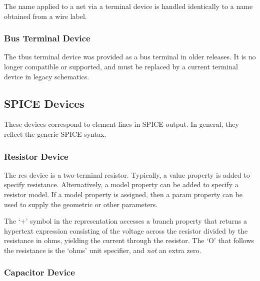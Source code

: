 The name applied to a net via a terminal device is handled
identically to a name obtained from a wire label.

\subsubsection{Bus Terminal Device}
The {\et tbus} terminal device was provided as a bus terminal in older
{\Xic} releases.  It is no longer compatible or supported, and must be
replaced by a current terminal device in legacy schematics.

\subsection{SPICE Devices}

These devices correspond to element lines in SPICE output.  In general,
they reflect the generic SPICE syntax.

\subsubsection{Resistor Device}

The {\et res} device is a two-terminal resistor.  Typically, a {\et
value} property is added to specify resistance.  Alternatively, a {\et
model} property can be added to specify a resistor model.  If a {\et
model} property is assigned, then a {\et param} property can be used
to supply the geometric or other parameters.

The `$+$' symbol in the representation accesses a {\et branch}
property that returns a hypertext expression consisting of the voltage
across the resistor divided by the resistance in ohms, yielding the
current through the resistor.  The `O' that follows the resistance is
the `ohms' unit specifier, and {\it not} an extra zero.

\subsubsection{Capacitor Device}

